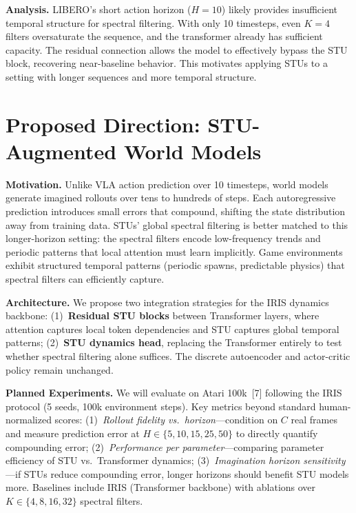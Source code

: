 \documentclass[10pt, letterpaper]{article}
\begin{document}
\textbf{Analysis.}
LIBERO's short action horizon ($H{=}10$) likely provides insufficient temporal structure for spectral filtering. With only 10 timesteps, even $K{=}4$ filters oversaturate the sequence, and the transformer already has sufficient capacity. The residual connection allows the model to effectively bypass the STU block, recovering near-baseline behavior. This motivates applying STUs to a setting with longer sequences and more temporal structure.

\section*{Proposed Direction: STU-Augmented World Models}

\textbf{Motivation.}
Unlike VLA action prediction over 10 timesteps, world models generate imagined rollouts over tens to hundreds of steps. Each autoregressive prediction introduces small errors that compound, shifting the state distribution away from training data. STUs' global spectral filtering is better matched to this longer-horizon setting: the spectral filters encode low-frequency trends and periodic patterns that local attention must learn implicitly. Game environments exhibit structured temporal patterns (periodic spawns, predictable physics) that spectral filters can efficiently capture.

\textbf{Architecture.}
We propose two integration strategies for the IRIS dynamics backbone: (1)~\textbf{Residual STU blocks} between Transformer layers, where attention captures local token dependencies and STU captures global temporal patterns; (2)~\textbf{STU dynamics head}, replacing the Transformer entirely to test whether spectral filtering alone suffices. The discrete autoencoder and actor-critic policy remain unchanged.

\textbf{Planned Experiments.}
We will evaluate on Atari 100k~[7] following the IRIS protocol (5 seeds, 100k environment steps). Key metrics beyond standard human-normalized scores: (1)~\textit{Rollout fidelity vs.\ horizon}---condition on $C$ real frames and measure prediction error at $H \in \{5, 10, 15, 25, 50\}$ to directly quantify compounding error; (2)~\textit{Performance per parameter}---comparing parameter efficiency of STU vs.\ Transformer dynamics; (3)~\textit{Imagination horizon sensitivity}---if STUs reduce compounding error, longer horizons should benefit STU models more. Baselines include IRIS (Transformer backbone) with ablations over $K \in \{4, 8, 16, 32\}$ spectral filters.
\end{document}
